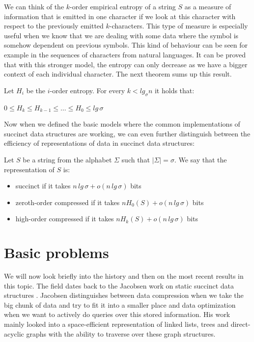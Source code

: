 We can think of the $k$-order empirical entropy of a string $S$ as a measure of information that is emitted in one character if we look at this character with respect to the previously emitted $k$-characters. This type of measure is especially useful when we know that we are dealing with some data where the symbol is somehow dependent on previous symbols. This kind of behaviour can be seen for example in the sequences of characters from natural languages. It can be proved that with this stronger model, the entropy can only decrease as we have a bigger context of each individual character. The next theorem sums up this result.

\begin{theorem}
Let $H_i$ be the $i$-order entropy. For every $k<lg_{\sigma}n$ it holds that:
\begin{center}
$0\leq H_{k}\leq H_{k-1}\leq \ldots\leq H_0 \leq lg\, \sigma$
\end{center}
\end{theorem}

Now when we defined the basic models where the common implementations of succinct data structures are working, we can even further distinguish between the efficiency of representations of data in succinct data structures:

\begin{theorem}
Let $S$ be a string from the alphabet $\Sigma$ such that $|\Sigma|=\sigma$. We say that the representation of $S$ is:
\begin{itemize}
    \item succinct if it takes $n\,lg\,\sigma + o(n\,lg\,\sigma)$ bits
    \item zeroth-order compressed if it takes $nH_0(S) + o(n\,lg\,\sigma)$ bits
    \item high-order compressed if it takes $nH_k(S) + o(n\,lg\,\sigma)$ bits
\end{itemize}
\end{theorem}

\section{Basic problems}

We will now look briefly into the history and then on the most recent results in this topic. The field dates back to the Jacobsen work on static succinct data structures \cite{jacobson1988succinct}. Jacobsen distinguishes between data compression when we take the big chunk of data and try to fit it into a smaller place and
data optimization when we want to actively do queries over this stored information. His work mainly looked into a space-efficient representation of linked lists, trees and direct-acyclic graphs with the ability to traverse over these graph structures.

